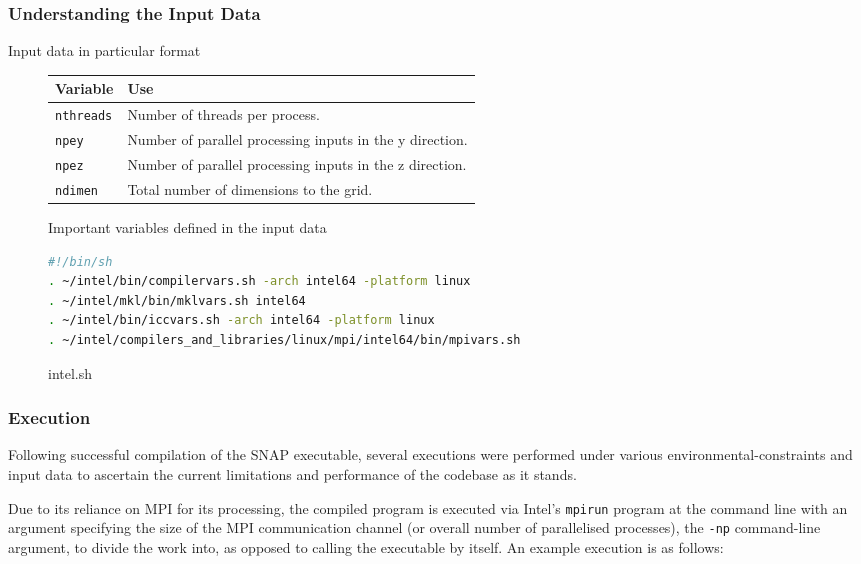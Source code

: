 \documentclass[conference]{IEEEtran}
\begin{document}
\subsubsection{Understanding the Input Data}

Input data in particular format

\begin{figure}
    \centering
    \begin{tabular}{| p{1.7cm} | p{5.7cm} |}
        \hline
        Variable & Use \\
        \hline
        \texttt{nthreads} & Number of threads per process. \\
        \texttt{npey} & Number of parallel processing inputs in the y direction. \\
        \texttt{npez} & Number of parallel processing inputs in the z direction. \\
        \texttt{ndimen} & Total number of dimensions to the grid. \\
        \hline
    \end{tabular}
    \caption{Important variables defined in the input data}
    \label{table:input-data}
\end{figure}

\begin{figure}
    \centering
    \begin{lstlisting}[language=bash]
#!/bin/sh
. ~/intel/bin/compilervars.sh -arch intel64 -platform linux
. ~/intel/mkl/bin/mklvars.sh intel64
. ~/intel/bin/iccvars.sh -arch intel64 -platform linux
. ~/intel/compilers_and_libraries/linux/mpi/intel64/bin/mpivars.sh 
    \end{lstlisting}
    \caption{intel.sh}
    \label{source_list}
\end{figure}

\subsubsection{Execution}

Following successful compilation of the SNAP executable, several executions were performed under various environmental-constraints and input data to ascertain the current limitations and performance of the codebase as it stands.

Due to its reliance on MPI for its processing, the compiled program is executed via Intel's \texttt{mpirun} program at the command line with an argument specifying the size of the MPI communication channel (or overall number of parallelised processes), the \texttt{-np} command-line argument, to divide the work into, as opposed to calling the executable by itself. An example execution is as follows:
\end{document}

